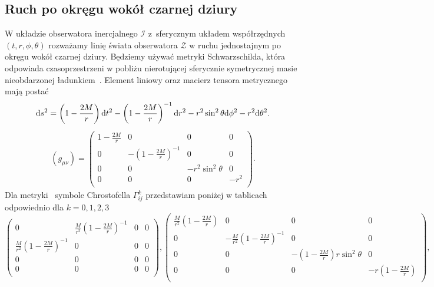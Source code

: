 \subsection{Ruch po okręgu wokół czarnej dziury}
W układzie obserwatora inercjalnego $\mathcal{I}$ z~sferycznym układem
współrzędnych $(t,r,\phi,\theta)$ rozważamy linię świata 
obserwatora $\mathcal{Z}$ w ruchu jednostajnym po okręgu wokół czarnej dziury.
Będziemy używać metryki Schwarzschilda, która odpowiada 
czasoprzestrzeni w pobliżu nierotującej sferycznie symetrycznej masie 
nieobdarzonej ładunkiem~\cite{hartle2016}. 
Element liniowy oraz macierz tensora metrycznego mają postać
\begin{align} \label{CDlin}
\text{d} s^2 = 
 \left(1-\frac{2 M}{r}\right) \text{d} t^2 
 -\left(1-\frac{2 M}{r}\right)^{-1} \text{d} r^2 
 -r^2 \sin ^2\theta\text{d} \phi^2 
 -r^2 \text{d} \theta^2.
\end{align}
\begin{align}\label{CDmetric}
(g_{\mu\nu}) = \left(
\begin{array}{cccc}
 1-\frac{2 M}{r} & 0 & 0 & 0 \\
 0 & -\left(1-\frac{2 M}{r}\right)^{-1} & 0 & 0 \\
 0 & 0 & -r^2 \sin ^2\theta  & 0 \\
 0 & 0 & 0 & -r^2 \\
\end{array}
\right).
\end{align}
Dla metryki~\cite{CDmetric} symbole Chrostofella $\Gamma^k _{ij}$ 
przedstawiam poniżej w tablicach odpowiednio dla $k=0,1,2,3$
$$
\left(
\begin{array}{cccc}
 0 & \frac{M}{r^2}\left( 1 - \frac{2M}{r}  \right)^{-1}& 0 & 0 \\
 \frac{M}{r^2}\left( 1 - \frac{2M}{r}  \right)^{-1} & 0 & 0 & 0 \\
 0 & 0 & 0 & 0 \\
 0 & 0 & 0 & 0 \\
\end{array}
\right),\left(
\begin{array}{cccc}
 \frac{M}{r^2}\left( 1 - \frac{2M}{r}  \right) & 0 & 0 & 0 \\
 0 &-\frac{M}{r^2}\left( 1 - \frac{2M}{r}  \right)^{-1} & 0 & 0 \\
 0 & 0 & -\left(1-\frac{2M}{r}\right)r \sin ^2\theta  & 0 \\
 0 & 0 & 0 & -r \left(1-\frac{2M}{r}\right) \\
\end{array}
\right),
$$
